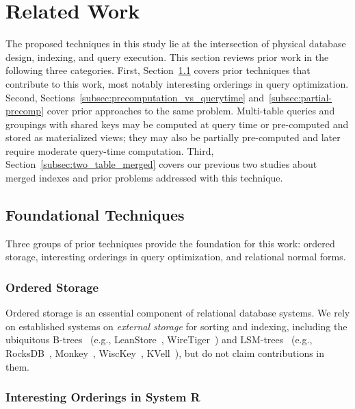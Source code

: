 \documentclass[sigconf, pdfa, nonacm]{acmart}
\begin{document}
\section{Related Work}\label{sec:related_work}

The proposed techniques in this study lie at the intersection of physical database design, indexing, and query execution. This section reviews prior work in the following three categories.
First, Section~\ref{subsec:prior_techniques} covers prior techniques that contribute to this work, most notably interesting orderings in query optimization.
Second, Sections~\ref{subsec:precomputation_vs_querytime} and~\ref{subsec:partial-precomp} cover prior approaches to the same problem.
Multi-table queries and groupings with shared keys may be computed at query time or pre-computed and stored as materialized views; they may also be partially pre-computed and later require moderate query-time computation.
Third, Section~\ref{subsec:two_table_merged} covers our previous two studies about merged indexes and prior problems addressed with this technique.

\subsection{Foundational Techniques}\label{subsec:prior_techniques}

Three groups of prior techniques provide the foundation for this work: ordered storage, interesting orderings in query optimization, and relational normal forms.

\subsubsection{Ordered Storage}\label{subsec:ordered_storage}

Ordered storage is an essential component of relational database systems. We rely on established systems on \textit{external storage} for sorting and indexing, including the ubiquitous B-trees~\cite{bayer1972organization, comer1979ubiquitous, Graefe11a, Graefe24} (e.g., LeanStore~\cite{leanstore18}, WireTiger~\cite{wiredtiger}) and LSM-trees~\cite{ONeil1996LSMTree,Jagadish1997LSM} (e.g., RocksDB~\cite{rocksdb21}, Monkey~\cite{dayan2017monkey}, WiscKey~\cite{wisckey}, KVell~\cite{lepers2019kvell}), but do not claim contributions in them.

\subsubsection{Interesting Orderings in System R}\label{subsec:system_r}
\end{document}
